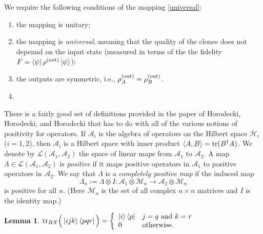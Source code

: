 \documentclass[reqno]{amsart}
\newtheorem{lemma}{Lemma}
\numberwithin{lemma}{section}
\numberwithin{proposition}{section}
\newcommand{\out}{\textnormal{out}}
\newcommand{\tr}{\textnormal{tr}}
\begin{document}
We require the following conditions of the mapping \eqref{universal}:
\begin{enumerate}
\item the mapping is unitary;
\item the mapping is \emph{universal}, meaning that the quality of the clones does not depennd on the input state (measured in terms of the the fidelity $F = \bra{\psi} \rho^{(\out)} \ket{\psi}$);
\item the outputs are symmetric, i.e., $\rho_{A}^{(\out)} = \rho_{B}^{(\out)}$.
\item {}
\end{enumerate}

\begin{remark}
There is a fairly good set of definitions provided in the paper of Horodecki, Horodecki, and Horodecki \cite{HORODECKI19961} that has to do with all of the various notions of positivity for operators. If $\mathcal{A}_{i}$ is the algebra of operators on the Hilbert space $\mathcal{H}_{i}$ ($i = 1,2$), then $\mathcal{A}_{i}$ is a Hilbert space with inner product $\langle A,B \rangle = \tr (B^{\dagger}A)$. We denote by $\mathcal{L}(\mathcal{A}_{1}, \mathcal{A}_{2})$ the space of linear maps from $\mathcal{A}_{1}$ to $\mathcal{A}_{2}$. A map $\Lambda \in \mathcal{L}(\mathcal{A}_{1}, \mathcal{A}_{2})$ is \emph{positive} if it maps positive operators in $\mathcal{A}_{1}$ to positive operators in $\mathcal{A}_{2}$. We say that $\Lambda$ is a \emph{completely positive map} if the induced map
\begin{equation*}
\Lambda_{n} := \Lambda \otimes I: \mathcal{A}_{1} \otimes \mathcal{M}_{n} \to \mathcal{A}_{2} \otimes \mathcal{M}_{n}
\end{equation*}
is positive for all $n$. (Here $\mathcal{M}_{n}$ is the set of all complex $n \times n$ matrices and $I$ is the identity map.)
\end{remark}

\begin{lemma}
\label{BXpartialtrace}
$\displaystyle \tr_{BX} \Big ( \ket{ijk} \bra{pqr} \Big ) =
\left \{
\begin{array}{ll}
\ket{i} \bra{p} & j = q \ \textnormal{and} \ k = r\\
0 & \textnormal{otherwise.}
\end{array}
\right .$
\end{lemma}
\end{document}
